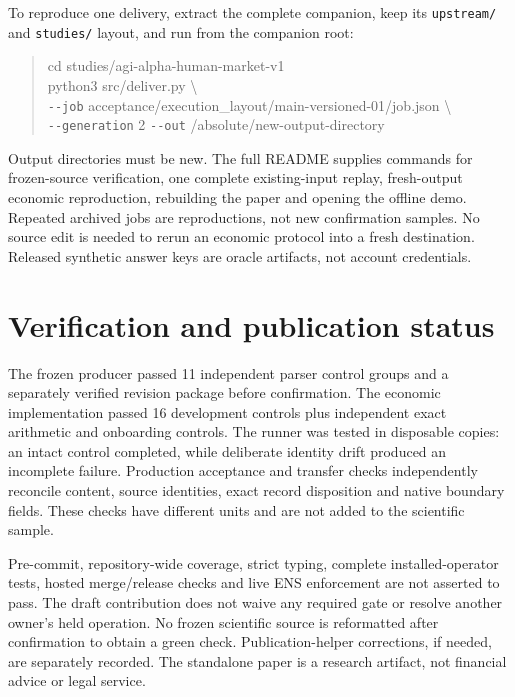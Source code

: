 \documentclass[11pt,letterpaper]{article}
\newcommand{\code}[1]{\texttt{\small #1}}
\begin{document}
To reproduce one delivery, extract the complete companion, keep its \code{upstream/} and \code{studies/} layout, and run from the companion root:
\begin{quote}\small\ttfamily
cd studies/agi-alpha-human-market-v1 \\
python3 src/deliver.py \textbackslash \\
\quad \verb|--job| acceptance/execution\_layout/main-versioned-01/job.json \textbackslash \\
\quad \verb|--generation| 2 \verb|--out| /absolute/new-output-directory
\end{quote}
Output directories must be new. The full README supplies commands for frozen-source verification, one complete existing-input replay, fresh-output economic reproduction, rebuilding the paper and opening the offline demo. Repeated archived jobs are reproductions, not new confirmation samples. No source edit is needed to rerun an economic protocol into a fresh destination. Released synthetic answer keys are oracle artifacts, not account credentials.

\section{Verification and publication status}
The frozen producer passed 11 independent parser control groups and a separately verified revision package before confirmation. The economic implementation passed 16 development controls plus independent exact arithmetic and onboarding controls. The runner was tested in disposable copies: an intact control completed, while deliberate identity drift produced an incomplete failure. Production acceptance and transfer checks independently reconcile content, source identities, exact record disposition and native boundary fields. These checks have different units and are not added to the scientific sample.


Pre-commit, repository-wide coverage, strict typing, complete installed-operator tests, hosted merge/release checks and live ENS enforcement are not asserted to pass. The draft contribution does not waive any required gate or resolve another owner's held operation. No frozen scientific source is reformatted after confirmation to obtain a green check. Publication-helper corrections, if needed, are separately recorded. The standalone paper is a research artifact, not financial advice or legal service.
\end{document}
